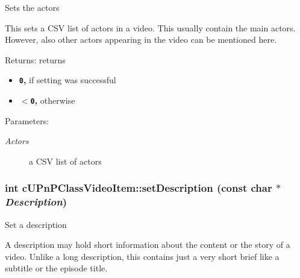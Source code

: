 Sets the actors

This sets a CSV list of actors in a video. This usually contain the main actors. However, also other actors appearing in the video can be mentioned here.

\begin{Desc}
\item[Returns:]returns\begin{itemize}
\item {\bf {\tt 0},} if setting was successful\item {\bf {\tt $<$0},} otherwise \end{itemize}
\end{Desc}
\begin{Desc}
\item[Parameters:]
\begin{description}
\item[{\em Actors}]a CSV list of actors \end{description}
\end{Desc}
\hypertarget{classcUPnPClassVideoItem_f5a642732c66b6920f5b4646a4c34a92}{
\subsubsection[{setDescription}]{\setlength{\rightskip}{0pt plus 5cm}int cUPnPClassVideoItem::setDescription (const char $\ast$ {\em Description})}}
\label{classcUPnPClassVideoItem_f5a642732c66b6920f5b4646a4c34a92}


Set a description

A description may hold short information about the content or the story of a video. Unlike a long description, this contains just a very short brief like a subtitle or the episode title.

